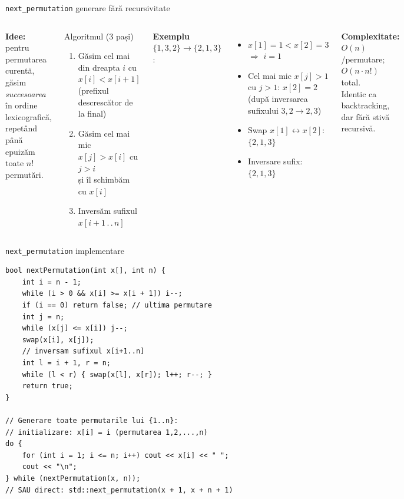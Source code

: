 ﻿\documentclass[10pt]{beamer}
\begin{document}
\begin{frame}{\texttt{next\_permutation} \textemdash{} generare fără recursivitate}
  \begin{columns}[T]
  \textbf{Idee:} pentru permutarea curentă, găsim \textit{succesoarea} în ordine
  lexicografică, repetând până epuizăm toate $n!$ permutări.
  \begin{block}{Algoritmul (3 pași)}
    \begin{enumerate}\itemsep1pt
      \item Găsim cel mai din dreapta $i$ cu $x[i] < x[i+1]$\\ (prefixul descrescător de la final)
      \item Găsim cel mai mic $x[j] > x[i]$ cu $j > i$\\ și îl schimbăm cu $x[i]$
      \item Inversăm sufixul $x[i+1\,.\,.\,n]$
    \end{enumerate}
  \end{block}
  \textbf{Exemplu} $\{1,3,2\} \rightarrow \{2,1,3\}$:
  \begin{itemize}\itemsep1pt
    \item[] $x[1]{=}1 < x[2]{=}3$ $\Rightarrow$ $i=1$
    \item[] Cel mai mic $x[j]>1$ cu $j>1$: $x[2]{=}2$\\
      {\small (după inversarea sufixului $3,2 \rightarrow 2,3$)}
    \item[] Swap $x[1] \leftrightarrow x[2]$: $\{2,1,3\}$
    \item[] Inversare sufix: $\{2,1,3\}$
  \end{itemize}
  \smallskip
  \textbf{Complexitate:} $O(n)$/permutare; $O(n \cdot n!)$ total.\\
  \alert{Identic ca backtracking, dar fără stivă recursivă.}
  \end{columns}
\end{frame}

\begin{frame}[fragile]{\texttt{next\_permutation} \textemdash{} implementare}
  \begin{lstlisting}
bool nextPermutation(int x[], int n) {
    int i = n - 1;
    while (i > 0 && x[i] >= x[i + 1]) i--;
    if (i == 0) return false; // ultima permutare
    int j = n;
    while (x[j] <= x[i]) j--;
    swap(x[i], x[j]);
    // inversam sufixul x[i+1..n]
    int l = i + 1, r = n;
    while (l < r) { swap(x[l], x[r]); l++; r--; }
    return true;
}

// Generare toate permutarile lui {1..n}:
// initializare: x[i] = i (permutarea 1,2,...,n)
do {
    for (int i = 1; i <= n; i++) cout << x[i] << " ";
    cout << "\n";
} while (nextPermutation(x, n));
// SAU direct: std::next_permutation(x + 1, x + n + 1)
  \end{lstlisting}
\end{frame}
\end{document}
